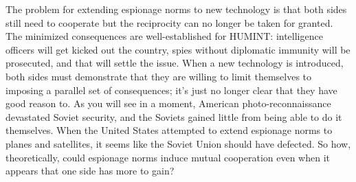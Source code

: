 \documentclass[11pt]{memoir}
\begin{document}
\begin{refsegment}
The problem for extending espionage norms to new technology is that both sides still need to cooperate but the reciprocity can no longer be taken for granted. The minimized consequences are well-established for HUMINT: intelligence officers will get kicked out the country, spies without diplomatic immunity will be prosecuted, and that will settle the issue. When a new technology is introduced, both sides must demonstrate that they are willing to limit themselves to imposing a parallel set of consequences; it's just no longer clear that they have good reason to. As you will see in a moment, American photo-reconnaissance devastated Soviet security, and the Soviets gained little from being able to do it themselves. When the United States attempted to extend espionage norms to planes and satellites, it seems like the Soviet Union should have defected. So how, theoretically, could espionage norms induce mutual cooperation even when it appears that one side has more to gain?



\end{refsegment}
\end{document}
